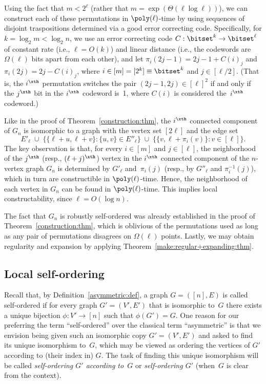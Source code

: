 Using the fact that $m<2^\ell$
(rather that $m=\exp(\Theta(\ell\log\ell))$),
we can construct each of these permutations in $\poly(\ell)$-time
by using sequences of disjoint traspositions determined
via a good error correcting code.
Specifically, for $k=\log_2m<\log_2n$,
we use an error correcting code $C:\bitset^k\to\bitset^\ell$
of constant rate (i.e., $\ell=O(k)$) and linear distance
(i.e., the codewords are $\Omega(\ell)$ bits apart from each other),
and let $\pi_i(2j-1)=2j-1+C(i)_j$ and $\pi_i(2j)=2j-C(i)_j$,
where $i\in[m]=[2^k]\equiv\bitset^k$ and $j\in[\ell/2]$.
(That is, the $i^\xth$ permutation switches the pair $(2j-1,2j)\in[\ell]^2$
if and only if the $j^\xth$ bit in the $i^\xth$ codeword is~1,
where $C(i)$ is considered the~$i^\xth$ codeword.)

Like in the proof of Theorem~\ref{construction:thm},
the $i^\xth$ connected component of $G_n$ is isomorphic
to a graph with the vertex set $[2\ell]$
and the edge set
\begin{equation}\label{edges-of-cc:eq}
E'_\ell \;\cup\; \{\{\ell+u,\ell+v\}:\{u,v\}\in E''_\ell\}
         \;\cup\; \{\{v,\ell+\pi_i(v)\}:v\!\in\![\ell]\}.
\end{equation}
The key observation is that, for every $i\in[m]$ and $j\in[\ell]$,
the neighborhood of the $j^\xth$ (resp., $(\ell+j)^\xth$) vertex
in the $i^\xth$ connected component of the $n$-vertex graph $G_n$
is determined by $G'_\ell$ and~$\pi_i(j)$
(resp., by $G''_\ell$ and $\pi_i^{-1}(j)$),
which in turn are constructible in $\poly(\ell)$-time.
Hence, the neighborhood of each vertex in $G_n$
can be found in $\poly(\ell)$-time.
This implies local constructability, since $\ell=O(\log n)$.

The fact that $G_n$ is robustly self-ordered was already
established in the proof of Theorem~\ref{construction:thm},
which is oblivious of the permutations used as long as any
pair of permutations disagrees on $\Omega(\ell)$ points.
Lastly, we may obtain regularity and expansion
by applying Theorem~\ref{make:regular+expanding:thm}.
%
%
%
%
\EPF


%
%
\subsection{Local self-ordering}
\label{local-so:sec}
Recall that, by Definition~\ref{asymmetric:def},
a graph $G=([n],E)$ is called {\sf self-ordered}
if for every graph $G'=(V',E')$ that is isomorphic to~$G$
there exists a unique bijection $\phi:V'\to[n]$ such that $\phi(G')=G$.
One reason for our preferring the term ``self-ordered'' over
the classical term ``asymmetric'' is that we envision being
given such an isomorphic copy $G'=(V',E')$ and asked to find its
unique isomorphism to~$G$, which may be viewed as ordering
the vertices of $G'$ according to (their index in) $G$.
The task of finding this unique isomorphism
will be called {\em self-ordering $G'$ according to~$G$}\/
or {\em self-ordering $G'$}\/ (when~$G$ is clear from the context).


